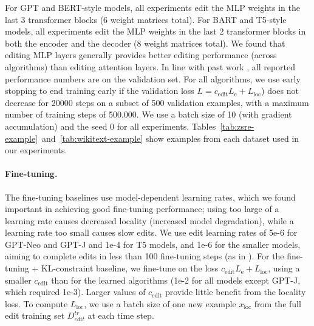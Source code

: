 \documentclass{article}
\makeatletter
\newcommand{\xloc}{x_\text{loc}}
\newcommand{\losse}{L_\text{e}}
\newcommand{\lossl}{L_\text{loc}}
\newcommand{\dtrain}{D^{tr}_{edit}}
\let\origsection\section
\renewcommand\section{\@ifstar{\starsection}{\nostarsection}}
\newcommand\nostarsection[1]
{\sectionprelude\origsection{#1}\sectionpostlude}
\newcommand\starsection[1]
{\sectionprelude\origsection*{#1}\sectionpostlude}
\newcommand\sectionprelude{%
  \vspace{-1.5mm}
}
\newcommand\sectionpostlude{%
  \vspace{-2mm}
}
\let\origsubsection\subsection
\renewcommand\subsection{\@ifstar{\starsubsection}{\nostarsubsection}}
\newcommand\nostarsubsection[1]
{\subsectionprelude\origsubsection{#1}\subsectionpostlude}
\newcommand\starsubsection[1]
{\subsectionprelude\origsubsection*{#1}\subsectionpostlude}
\newcommand\subsectionprelude{%
  \vspace{-1.5mm}
}
\newcommand\subsectionpostlude{%
  \vspace{-1.5mm}
}
\makeatother
\begin{document}
\begin{appendix}
\section{Experimental Details}
\label{sec:details}
\makefeverzsretables

For GPT and BERT-style models, all experiments edit the MLP weights in the last 3 transformer blocks (6 weight matrices total). For BART and T5-style models, all experiments edit the MLP weights in the last 2 transformer blocks in both the encoder and the decoder (8 weight matrices total). We found that editing MLP layers generally provides better editing performance (across algorithms) than editing attention layers. In line with past work \citep{Cao2021EditingFK}, all reported performance numbers are on the validation set. For all algorithms, we use early stopping to end training early if the validation loss $L = c_\text{edit}\losse + \lossl$) does not decrease for 20000 steps on a subset of 500 validation examples, with a maximum number of training steps of 500,000. We use a batch size of 10 (with gradient accumulation) and the seed 0 for all experiments. Tables~\ref{tab:zsre-example}~and~\ref{tab:wikitext-example} show examples from each dataset used in our experiments.

\subsection{Hyperparameters}

\paragraph{Fine-tuning.} The fine-tuning baselines use model-dependent learning rates, which we found important in achieving good fine-tuning performance; using too large of a learning rate causes decreased locality (increased model degradation), while a learning rate too small causes slow edits. We use edit learning rates of 5e-6 for GPT-Neo and GPT-J and 1e-4 for T5 models, and 1e-6 for the smaller models, aiming to complete edits in less than 100 fine-tuning steps (as in \cite{Cao2021EditingFK}). For the fine-tuning + KL-constraint baseline, we fine-tune on the loss $c_\text{edit}\losse + \lossl$, using a smaller $c_\text{edit}$ than for the learned algorithms (1e-2 for all models except GPT-J, which required 1e-3). Larger values of $c_\text{edit}$ provide little benefit from the locality loss. To compute $\lossl$, we use a batch size of one new example $\xloc$ from the full edit training set $\dtrain$ at each time step. 


\end{appendix}
\end{document}
